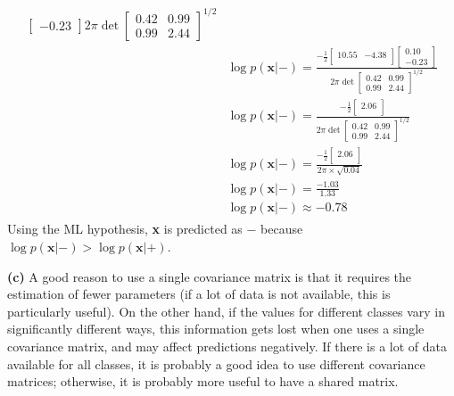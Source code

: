 \documentclass[leqno]{article}
\begin{document}
\begin{gather*}
\begin{split}
{\begin{bmatrix}
   -0.23 
\end{bmatrix}}{2\pi\det{\begin{bmatrix}
   0.42 & 0.99\\
   0.99 & 2.44 
\end{bmatrix}}^{1/2}}\\
&\log p(\textbf{x}|-) = 
\frac{-\frac{1}{2}\begin{bmatrix}
   10.55 & -4.38\\ 
\end{bmatrix}\begin{bmatrix}
   0.10\\
  -0.23 
\end{bmatrix}}{2\pi\det{\begin{bmatrix}
   0.42 & 0.99\\
   0.99 & 2.44 
\end{bmatrix}}^{1/2}}\\
&\log p(\textbf{x}|-) = 
\frac{-\frac{1}{2}\begin{bmatrix}
   2.06\\ 
\end{bmatrix}}{2\pi\det{\begin{bmatrix}
   0.42 & 0.99\\
   0.99 & 2.44 
\end{bmatrix}}^{1/2}}\\
&\log p(\textbf{x}|-) = 
\frac{-\frac{1}{2}\begin{bmatrix}
   2.06\\ 
\end{bmatrix}}{2\pi \times \sqrt{0.04}}\\
&\log p(\textbf{x}|-) = 
\frac{-1.03}{1.33}\\
& \log p(\textbf{x}|-) \approx -0.78
\end{split}
\end{gather*}
Using the ML hypothesis, \textbf{x} is predicted as $-$ because $\log p(\textbf{x}|-) > \log p(\textbf{x}|+)$. %

\hfill

\noindent \textbf{(c)} A good reason to use a single covariance matrix is that it requires the estimation of fewer parameters (if a lot of 
data is not available, this is particularly useful). On the other hand, if the values for different 
classes vary in significantly different ways, this information gets lost when one uses a single covariance matrix, and may  affect predictions negatively. 
If there is a lot of data available for all classes, it is probably a good idea to use different covariance matrices; otherwise, it is probably more useful 
to have a shared matrix.
\end{document}
